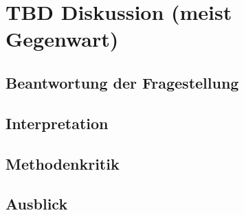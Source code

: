 %
%
\glsresetall
\chapter{TBD Diskussion (meist Gegenwart)}
\section{Beantwortung der Fragestellung}\label{section.diskussion.fragestellung}
\section{Interpretation}\label{section.diskussion.interpretation}
\section{Methodenkritik}\label{section.diskussion.methodenkritik}
\section{Ausblick}\label{section.diskussion.ausblick}


